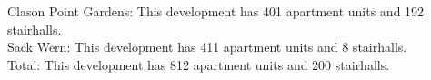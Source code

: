 {Clason Point Gardens}: This development has 401 apartment units and 192 stairhalls.\\{Sack Wern}: This development has 411 apartment units and 8 stairhalls.\\{Total}: This development has 812 apartment units and 200 stairhalls.\\